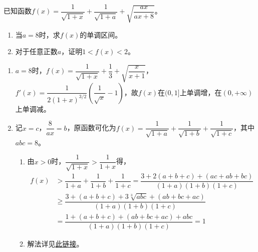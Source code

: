 \begin{que}
	已知函数$f(x)=\dfrac{1}{\sqrt{1+x}}+\dfrac{1}{\sqrt{1+a}}+\sqrt{\dfrac{ax}{ax+8}}$。
	\begin{enumerate}
		\item 当$a=8$时，求$f(x)$的单调区间。
		\item 对于任意正数$a$，证明$1<f(x)<2$。
	\end{enumerate}
\end{que}
\sol \begin{enumerate}
	\item $a=8$时，$f(x)=\dfrac{1}{\sqrt{1+x}}+\dfrac{1}{3}+\sqrt{\dfrac{x}{x+1}}$，$f'(x)=\dfrac{1}{2(1+x)^{3/2}}\left(\dfrac{1}{\sqrt{x}}-1\right)$，故$f(x)$在$(0,1]$上单调增，在$(0,+\infty)$上单调减。
	\item 记$x=c$，$\dfrac{8}{ax}=b$，原函数可化为$f(x)=\dfrac{1}{\sqrt{1+a}}+\dfrac{1}{\sqrt{1+b}}+\dfrac{1}{\sqrt{1+c}}$，其中$abc=8$。\par
	\begin{enumerate}
		\item 由$x>0$时，$\dfrac{1}{\sqrt{1+x}}>\dfrac{1}{1+x}$得，$$\begin{aligned}f(x)&>\dfrac{1}{1+a}+\dfrac{1}{1+b}+\dfrac{1}{1+c}=\dfrac{3+2(a+b+c)+(ac+ab+bc)}{(1+a)(1+b)(1+c)}\\&\geqslant \dfrac{3+(a+b+c)+3\sqrt[3]{abc}+(ab+bc+ac)}{(1+a)(1+b)(1+c)}\\&=\dfrac{1+(a+b+c)+(ab+bc+ac)+abc}{(1+a)(1+b)(1+c)}=1\end{aligned}$$
		\item 解法详见\href{http://lanqi.org/solution/2489/}{此链接}。
	\end{enumerate}
\end{enumerate}\par\hfill\gk{}\hard\par


